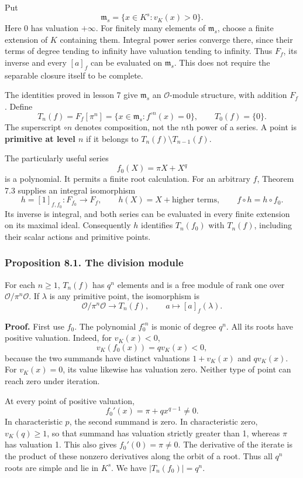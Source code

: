 \documentclass[11pt,a4paper]{article}
\begin{document}
Put \[
\mathfrak m_s=\{x\in K^s:v_K(x)>0\}.
\] Here \(0\) has valuation \(+\infty\). For finitely many elements of
\(\mathfrak m_s\), choose a finite extension of \(K\) containing them.
Integral power series converge there, since their terms of degree
tending to infinity have valuation tending to infinity. Thus \(F_f\),
its inverse and every \([a]_f\) can be evaluated on \(\mathfrak m_s\).
This does not require the separable closure itself to be complete.

The identities proved in lesson 7 give \(\mathfrak m_s\) an
\(\mathcal O\)-module structure, with addition \(F_f\). Define \[
T_n(f)=F_f[\pi^n]
 =\{x\in\mathfrak m_s:f^{\circ n}(x)=0\},\qquad T_0(f)=\{0\}.
\tag{1}
\] The superscript \(\circ n\) denotes composition, not the \(n\)th
power of a series. A point is \textbf{primitive at level \(n\)} if it
belongs to \(T_n(f)\setminus T_{n-1}(f)\).

The particularly useful series \[
f_0(X)=\pi X+X^q
\tag{2}
\] is a polynomial. It permits a finite root calculation. For an
arbitrary \(f\), Theorem 7.3 supplies an integral isomorphism \[
h=[1]_{f,f_0}:F_{f_0}\longrightarrow F_f,\qquad
h(X)=X+\text{higher terms},\qquad f\circ h=h\circ f_0.
\tag{3}
\] Its inverse is integral, and both series can be evaluated in every
finite extension on its maximal ideal. Consequently \(h\) identifies
\(T_n(f_0)\) with \(T_n(f)\), including their scalar actions and
primitive points.

\subsubsection{Proposition 8.1. The division
module}\label{proposition-8.1.-the-division-module}

For each \(n\geq1\), \(T_n(f)\) has \(q^n\) elements and is a free
module of rank one over \(\mathcal O/\pi^n\mathcal O\). If \(\lambda\)
is any primitive point, the isomorphism is \[
\mathcal O/\pi^n\mathcal O\longrightarrow T_n(f),\qquad
a\longmapsto[a]_f(\lambda).
\tag{4}
\]

\textbf{Proof.} First use \(f_0\). The polynomial \(f_0^{\circ n}\) is
monic of degree \(q^n\). All its roots have positive valuation. Indeed,
for \(v_K(x)<0\), \[
v_K(f_0(x))=qv_K(x)<0,
\] because the two summands have distinct valuations \(1+v_K(x)\) and
\(qv_K(x)\). For \(v_K(x)=0\), its value likewise has valuation zero.
Neither type of point can reach zero under iteration.

At every point of positive valuation, \[
f_0'(x)=\pi+q x^{q-1}\ne0.
\tag{5}
\] In characteristic \(p\), the second summand is zero. In
characteristic zero, \(v_K(q)\geq1\), so that summand has valuation
strictly greater than 1, whereas \(\pi\) has valuation 1. This also
gives \(f_0'(0)=\pi\ne0\). The derivative of the iterate is the product
of these nonzero derivatives along the orbit of a root. Thus all \(q^n\)
roots are simple and lie in \(K^s\). We have \(|T_n(f_0)|=q^n\).
\end{document}
